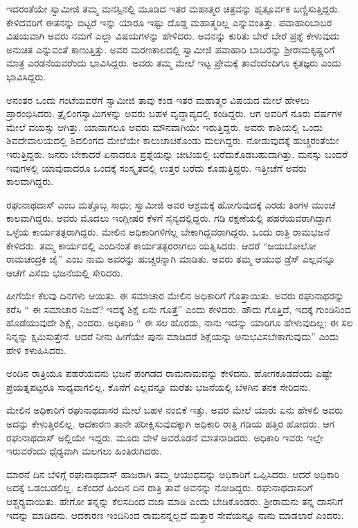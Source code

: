 ಇದರಂತೆಯೇ ಸ್ವಾಮೀಜಿ ತಮ್ಮ ಮನಸ್ಸಿನಲ್ಲಿ ಮೂಡಿದ ಇತರ ಮಹಾತ್ಮರ ಚಿತ್ರವನ್ನು ಹೃತ್ಪೂರ್ವಕ ಬಣ್ಣಿಸುತ್ತಿದ್ದರು. ಕೇಳಿದವರಿಗೆ ಈತನನ್ನು ಬಿಟ್ಟರೆ ಇನ್ನು ಯಾರೂ ಇಷ್ಟು ದೊಡ್ಡ ಮಹಾತ್ಮರಿಲ್ಲ ಎನ್ನುವಂತಿತ್ತು. ಪವಾಹಾರಿಬಾಬರ ವಿಷಯವಾಗಿ ಅವರು ನಮಗೆ ಎಲ್ಲಾ ವಿಷಯಗಳನ್ನು ಹೇಳಿದರು. ಅವನನ್ನು ಕುರಿತು ಬೇರೆ ಬೇರೆ ಪ್ರಶ್ನೆ ಕೇಳುವುದು ಅನುಚಿತ ಎನ್ನುವಂತೆ ಕಾಣುತ್ತಿತ್ತು. ಅವರ ಮರಣಕಾಲದಲ್ಲಿ ಸ್ವಾಮೀಜಿ ಪವಾಹಾರಿ ಬಾಬರನ್ನು ಶ‍್ರೀರಾಮಕೃಷ್ಣರಿಗೆ ಮಾತ್ರ ಎರಡನೆಯವರೆಂದು ಭಾವಿಸಿದ್ದರು. ಅವರು ತಮ್ಮ ಮೇಲೆ ಇಟ್ಟ ಪ್ರೇಮಕ್ಕೆ ತಾವೆಂದೆಂದಿಗೂ ಕೃತಜ್ಞರು ಎಂದು ಭಾವಿಸಿದ್ದರು. 

 ಅನಂತರ ಒಂದು ಗಂಟೆಯವರೆಗೆ ಸ್ವಾಮೀಜಿ ತಾವು ಕಂಡ ಇತರ ಮಹಾತ್ಮರ ವಿಷಯದ ಮೇಲೆ ಹೇಳಲು ಪ್ರಾರಂಭಿಸಿದರು. ತ್ರೈಲಿಂಗಸ್ವಾಮಿಗಳನ್ನು ಅವರು ಬಹಳ ವೃದ್ಧಾಪ್ಯದಲ್ಲಿ ಕಂಡಿದ್ದರು. ಆಗ ಅವರಿಗೆ ನೂರು ವರ್ಷಗಳ ಮೇಲೆ ವಯಸ್ಸು ಆಗಿತ್ತು. ಯಾವಾಗಲೂ ಅವರು ಮೌನವಾಗಿಯೇ ಇರುತ್ತಿದ್ದರು. ಅವರು ಕಾಶಿಯಲ್ಲಿ ಒಂದು ಶಿವದೇವಾಲಯದಲ್ಲಿ ಶಿವಲಿಂಗದ ಮೇಲೆಯೇ ಕಾಲುಚಾಚಿಕೊಂಡು ಮಲಗಿದ್ದರು. ನೋಡುವುದಕ್ಕೆ ಹುಚ್ಚರಂತೆಯೇ ಇರುತ್ತಿದ್ದರು. ಜನರು ಬೇಕಾದರೆ ಏನಾದರೂ ಪ್ರಶ್ನೆಯನ್ನು ಚೀಟಿಯಲ್ಲಿ ಬರೆದುಕೊಡಬಹುದಾಗಿತ್ತು. ಮನಸ್ಸು ಬಂದರೆ ಇವುಗಳಲ್ಲಿ ಯಾವುದಾದರೂ ಒಂದಕ್ಕೆ ಸಂಸ್ಕೃತದಲ್ಲಿ ಉತ್ತರ ಬರೆದು ಕೊಡುತ್ತಿದ್ದರು. ಇತ್ತೀಚೆಗೆ ಅವರು ಕಾಲವಾಗಿದ್ದರು. 

 ರಘುನಾಥದಾಸ್ ಎಂಬ ಮತ್ತೊಬ್ಬ ಸಾಧು; ಸ್ವಾಮೀಜಿ ಅವರ ಆಶ್ರಮಕ್ಕೆ ಹೋಗುವುದಕ್ಕೆ ಎರಡು ತಿಂಗಳ ಮುಂಚೆ ಕಾಲವಾಗಿದ್ದರು. ಅವರು ಮೊದಲು ಇಂಗ್ಲೀಷರ ಕೆಳಗೆ ಸೈನ್ಯದಲ್ಲಿದ್ದರು. ಗಡಿ ರಕ್ಷಣೆಯಲ್ಲಿ ಪಹರೆಯವರಾಗಿದ್ದಾಗ ಒಳ್ಳೆಯ ಕಾರ್ಯತತ್ಪರಾಗಿದ್ದರು. ಮೇಲಿನ ಅಧಿಕಾರಿಗಳಿಗೆಲ್ಲ ಬೇಕಾಗಿದ್ದವರಾಗಿದ್ದರು. ಒಂದು ರಾತ್ರಿ ರಾಮಭಜನೆ ಕೇಳಿದರು. ತಮ್ಮ ಕಾರ್ಯದಲ್ಲಿ ಎಂದಿನಂತೆ ಕಾರ್ಯತತ್ಪರರಾಗಲು ಯತ್ನಿಸಿದರು. ಆದರೆ “ಜಯಬೋಲೋ ರಾಮಚಂದ್ರಕಿ ಜೈ” ಎಂಬ ನಾಮ ಅವರನ್ನು ಹುಚ್ಚರನ್ನಾಗಿ ಮಾಡಿತು. ಅವರು ತಮ್ಮ ಆಯುಧ ಡ್ರೆಸ್ ಎಲ್ಲವನ್ನೂ ಆಚೆಗೆ ಎಸೆದು ಭಜನೆಯಲ್ಲಿ ಸೇರಿದರು. 

 ಹೀಗೆಯೇ ಕೆಲವು ದಿನಗಳು ಆಯಿತು. ಈ ಸಮಾಚಾರ ಮೇಲಿನ ಅಧಿಕಾರಿಗೆ ಗೊತ್ತಾಯಿತು. ಅವರು ರಘುನಾಥರನ್ನು ಕರೆಸಿ “ ಈ ಸಮಾಚಾರ ನಿಜವೆ? ಇದಕ್ಕೆ ಶಿಕ್ಷೆ ಏನು ಗೊತ್ತೆ” ಎಂದು ಕೇಳಿದರು. ಹೌದು ಗೊತ್ತಿದೆ, ಇದಕ್ಕೆ ಗುಂಡಿನಿಂದ ಹೊಡೆಯುವುದೇ ಶಿಕ್ಷೆ, ಎಂದರು. ಅಧಿಕಾರಿ “ ಈ ಸಲ ಹೊರಡು, ನಾನು ಇದನ್ನು ಯಾರಿಗೂ ಹೇಳುವುದಿಲ್ಲ; ಈ ಸಲ ನಿನ್ನನ್ನು ಕ್ಷಮಿಸುತ್ತೇನೆ. ಆದರೆ ನೀನು ಹೀಗೆಯೇ ಪುನಃ ಮಾಡಿದರೆ ಶಿಕ್ಷೆಯನ್ನು ಅನುಭವಿಸಬೇಕಾಗುವುದು” ಎಂದು ಹೇಳಿ ಕಳುಹಿಸಿದರು. 

 ಅಂದಿನ ರಾತ್ರಿಯೂ ಪಹರೆಯವನು ಭಜನೆ ಪಂಗಡದ ರಾಮನಾಮವನ್ನು ಕೇಳಿದನು. ಹೋಗಕೂಡದೆಂದು ಎಷ್ಟೇ ಪ್ರಯತ್ನಪಟ್ಟರೂ ಸಾಧ್ಯವಾಗಲಿಲ್ಲ. ಕೊನೆಗೆ ಎಲ್ಲವನ್ನೂ ಮರೆತು ಭಜನೆಯಲ್ಲಿ ಬೆಳಗಿನ ತನಕ ಸೇರಿದನು. 

 ಮೇಲಿನ ಅಧಿಕಾರಿಗೆ ರಘುನಾಥದಾಸರ ಮೇಲೆ ಬಹಳ ನಂಬಿಕೆ ಇತ್ತು. ಅವರ ಮೇಲೆ ಯಾರು ಏನು ಹೇಳಲಿ ಅವರು ಅದನ್ನು ಕೇಳುತ್ತಿರಲಿಲ್ಲ. ಆದಕಾರಣ ತಾನೇ ಪರೀಕ್ಷಿಸುವುದಕ್ಕಾಗಿ ಅಧಿಕಾರಿ ರಾತ್ರಿ ಗಡಿಯ ಹತ್ತಿರ ಹೋದರು. ಆಗ ರಘುನಾಥದಾಸ್ ಅಲ್ಲಿಯೇ ಇದ್ದರು. ಮೂರು ವೇಳೆ ಅವರೊಡನೆ ಮಾತನಾಡಿದರು. ಅಧಿಕಾರಿ ಇವರು ಇಲ್ಲೇ ಇರುವರೆಂದು ಧೈರ‍್ಯವಾಗಿ ಮಲಗಲು ಹಿಂತಿರುಗಿದರು. 

 ಮಾರನೆ ದಿನ ಬೆಳಿಗ್ಗೆ ರಘುನಾಥದಾಸ್ ಹಾಜರಾಗಿ ತಮ್ಮ ಆಯುಧವನ್ನು ಅಧಿಕಾರಿಗೆ ಒಪ್ಪಿಸಿದರು. ಆದರೆ ಅಧಿಕಾರಿ ಅದಕ್ಕೆ ಒಡಂಬಡಲಿಲ್ಲ. ಏಕೆಂದರೆ ಹಿಂದಿನ ದಿನ ರಾತ್ರಿ ತಾವೆ ಅವನನ್ನು ನೋಡಿದ್ದರು. ರಘುನಾಥದಾಸರಿಗೆ ಆಶ್ಚರ‍್ಯವಾಯಿತು. ಹೇಗೋ‌ ತನ್ನನ್ನು ಕೆಲಸದಿಂದ ವಜಾ ಮಾಡಿ ಎಂದು ಬೇಡಿಕೊಂಡರು. ಶ‍್ರೀರಾಮನು ತನ್ನ ದಾಸನಿಗೆ ಇದನ್ನು ಮಾಡಿದನು. ಆದಕಾರಣ ಇಂದಿನಿಂದ ರಾಮನನ್ನಲ್ಲದೆ ಮತ್ತಾರ ಸೇವೆಯನ್ನೂ ನಾನು ಮಾಡಲಾರೆ ಎಂದರು. 

